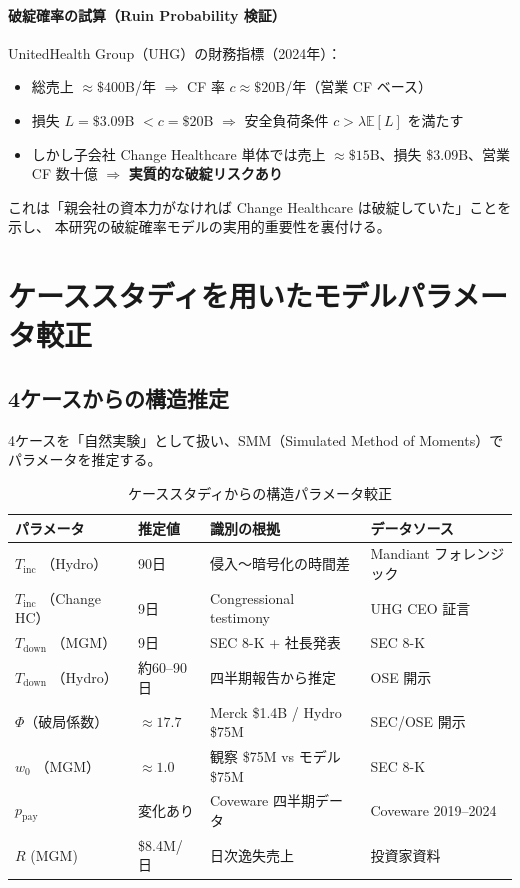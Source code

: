 \documentclass[a4paper,11pt]{article}
\newcommand{\E}{\mathbb{E}}
\theoremstyle{definition}
\begin{document}
\paragraph{破綻確率の試算（Ruin Probability 検証）}

UnitedHealth Group（UHG）の財務指標（2024年）：
\begin{itemize}[leftmargin=1.5em, itemsep=2pt]
  \item 総売上 $\approx \$400$B/年 $\Rightarrow$ CF 率 $c \approx \$20$B/年（営業 CF ベース）
  \item 損失 $L = \$3.09$B $< c = \$20$B $\Rightarrow$ 安全負荷条件 $c > \lambda\E[L]$ を満たす
  \item しかし子会社 Change Healthcare 単体では売上 $\approx \$15$B、損失 \$3.09B、営業 CF 数十億 $\Rightarrow$ \textbf{実質的な破綻リスクあり}
\end{itemize}

これは「親会社の資本力がなければ Change Healthcare は破綻していた」ことを示し、
本研究の破綻確率モデルの実用的重要性を裏付ける。

\section{ケーススタディを用いたモデルパラメータ較正}
\label{sec:calibration}

\subsection{4ケースからの構造推定}

4ケースを「自然実験」として扱い、SMM（Simulated Method of Moments）でパラメータを推定する。

\begin{table}[H]
  \centering
  \caption{ケーススタディからの構造パラメータ較正}
  \small
  \begin{tabularx}{\textwidth}{llXl}
    \toprule
    \rowcolor{LightBlue}
    パラメータ & 推定値 & 識別の根拠 & データソース \\
    \midrule
    $T_{\mathrm{inc}}$ （Hydro） & 90日 & 侵入〜暗号化の時間差 & Mandiant フォレンジック \\
    $T_{\mathrm{inc}}$ （Change HC） & 9日 & Congressional testimony & UHG CEO 証言 \\
    $T_{\mathrm{down}}$ （MGM） & 9日 & SEC 8-K + 社長発表 & SEC 8-K \\
    $T_{\mathrm{down}}$ （Hydro） & 約60--90日 & 四半期報告から推定 & OSE 開示 \\
    $\Phi$（破局係数） & $\approx 17.7$ & Merck \$1.4B / Hydro \$75M & SEC/OSE 開示 \\
    $w_0$ （MGM） & $\approx 1.0$ & 観察 \$75M vs モデル \$75M & SEC 8-K \\
    $p_{\mathrm{pay}}$ & 変化あり & Coveware 四半期データ & Coveware 2019--2024 \\
    $R$ (MGM) & \$8.4M/日 & 日次逸失売上 & 投資家資料 \\
    \bottomrule
  \end{tabularx}
\end{table}
\end{document}

